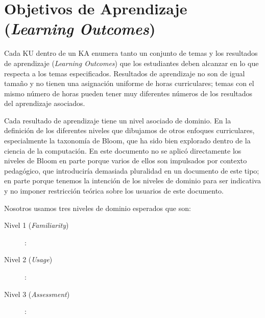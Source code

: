 \section{Objetivos de Aprendizaje ({\it Learning Outcomes})}
Cada KU dentro de un KA enumera tanto un conjunto de temas y los resultados de aprendizaje ({\it Learning Outcomes})
que los estudiantes deben alcanzar en lo que respecta a los temas especificados. 
Resultados de aprendizaje no son de igual tamaño y no tienen una asignación uniforme de horas curriculares; 
temas con el mismo número de horas pueden tener muy diferentes números de los resultados del aprendizaje asociados.

Cada resultado de aprendizaje tiene un nivel asociado de dominio. 
En la definición de los diferentes niveles que dibujamos de otros enfoques curriculares, 
especialmente la taxonomí­a de Bloom, que ha sido bien explorado dentro de la ciencia de la computación. 
En este documento no se aplicó directamente los niveles de Bloom en parte porque varios de 
ellos son impulsados por contexto pedagógico, que introducirí­a demasiada pluralidad en un documento de este tipo; 
en parte porque tenemos la intención de los niveles de dominio para ser indicativa y 
no imponer restricción teórica sobre los usuarios de este documento.

Nosotros usamos tres niveles de dominio esperados que son:
\begin{description}
 \item [Nivel 1 \Familiarity ({\it Familiarity})]: \LearningOutcomesTxtEsFamiliarity
 \item [Nivel 2 \Usage ({\it Usage})]: \LearningOutcomesTxtEsUsage
 \item [Nivel 3 \Assessment ({\it Assessment})]: \LearningOutcomesTxtEsAssessment
\end{description}


